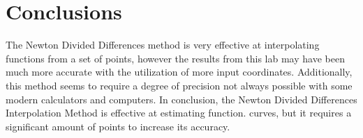 \documentclass[12pt, letterpaper]{article}
\begin{document}
\section{\label{conclusion}Conclusions}
	The Newton Divided Differences method is very effective at interpolating functions from a set of points, however the results from this lab may have been much more accurate with the utilization of more input coordinates. Additionally, this method seems to require a degree of precision not always possible with some modern calculators and computers. In conclusion, the Newton Divided Differences Interpolation Method is effective at estimating function. curves, but it requires a significant amount of points to increase its accuracy. 

\pagebreak
\appendix
%		
		
		
		
\end{document}
